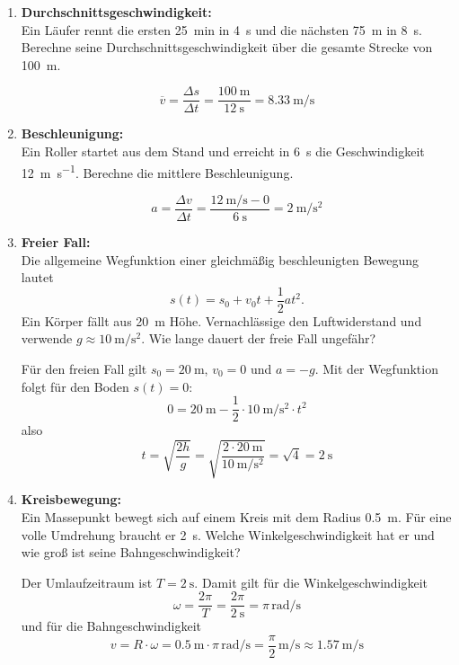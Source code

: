 \documentclass[11pt, a4paper]{article}
\begin{document}
\begin{enumerate}[label=\textbf{\arabic*.},itemsep=0.50cm]
    \item \textbf{Durchschnittsgeschwindigkeit:} \\
    Ein Läufer rennt die ersten \SI{25}{\meter}in  in \SI{4}{\second} und die nächsten \SI{75}{\meter} in \SI{8}{\second}. Berechne seine Durchschnittsgeschwindigkeit über die gesamte Strecke von \SI{100}{\meter}.
    \begin{solutionbox}
        \[
        \overline{v} = \frac{\Delta s}{\Delta t} = \frac{\SI{100}{\meter}}{\SI{12}{\second}} = \SI{8.33}{\meter\per\second}
        \]
    \end{solutionbox}

    \item \textbf{Beschleunigung:} \\
    Ein Roller startet aus dem Stand und erreicht in \SI{6}{\second} die Geschwindigkeit \SI{12}{\meter\per\second}. Berechne die mittlere Beschleunigung.
    \begin{solutionbox}
        \[
        a = \frac{\Delta v}{\Delta t} = \frac{\SI{12}{\meter\per\second} - 0}{\SI{6}{\second}} = \SI{2}{\meter\per\second\squared}
        \]
    \end{solutionbox}

    \item \textbf{Freier Fall:} \\
    Die allgemeine Wegfunktion einer gleichmäßig beschleunigten Bewegung lautet
    \[ s(t) = s_0 + v_0 t + \frac{1}{2} a t^2. \]
    Ein Körper fällt aus \SI{20}{\meter} Höhe. Vernachlässige den Luftwiderstand und verwende $g \approx \SI{10}{\meter\per\second^2}$. Wie lange dauert der freie Fall ungefähr?
    \begin{solutionbox}
        Für den freien Fall gilt $s_0 = \SI{20}{\meter}$, $v_0 = 0$ und $a = -g$.
        Mit der Wegfunktion folgt für den Boden $s(t)=0$:
        \[
        0 = \SI{20}{\meter} - \frac{1}{2} \cdot \SI{10}{\meter\per\second^2} \cdot t^2
        \]
        also
        \[
        t = \sqrt{\frac{2h}{g}} = \sqrt{\frac{2 \cdot \SI{20}{\meter}}{\SI{10}{\meter\per\second^2}}} = \sqrt{4} = \SI{2}{\second}
        \]
    \end{solutionbox}

    \item \textbf{Kreisbewegung:} \\
    Ein Massepunkt bewegt sich auf einem Kreis mit dem Radius \SI{0.5}{\meter}. Für eine volle Umdrehung braucht er \SI{2}{\second}. Welche Winkelgeschwindigkeit hat er und wie groß ist seine Bahngeschwindigkeit?
    \begin{solutionbox}
        Der Umlaufzeitraum ist $T = \SI{2}{\second}$.
        Damit gilt für die Winkelgeschwindigkeit
        \[
        \omega = \frac{2\pi}{T} = \frac{2\pi}{\SI{2}{\second}} = \pi\,\si{\radian\per\second}
        \]
        und für die Bahngeschwindigkeit
        \[
        v = R \cdot \omega = \SI{0.5}{\meter} \cdot \pi\,\si{\radian\per\second} = \frac{\pi}{2}\,\si{\meter\per\second} \approx \SI{1.57}{\meter\per\second}
        \]
    \end{solutionbox}


\end{enumerate}
\end{document}
